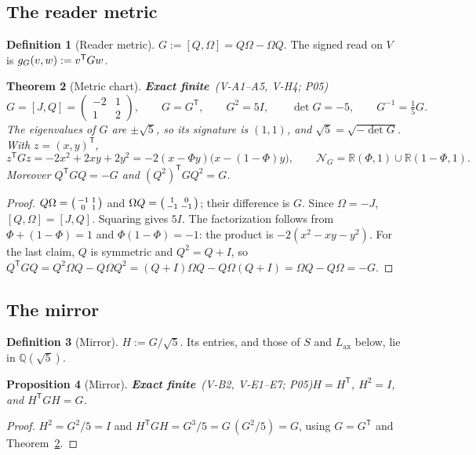 \documentclass[11pt,a4paper]{article}
\newcommand{\RR}{\mathbb{R}}\newcommand{\QQ}{\mathbb{Q}}\newcommand{\ZZ}{\mathbb{Z}}
\newcommand{\tp}{^{\mathsf T}}
\newcommand{\Lax}{L_{\mathrm{ax}}}\newcommand{\Lpr}{L_{\mathrm{pr}}}
\newcommand{\st}[1]{\textsf{\small\textbf{#1}}}
\newcommand{\Sfin}{\st{Exact finite}}\newcommand{\Sder}{\st{Exact derived}}
\theoremstyle{plain}
\newtheorem{thm}{Theorem}[section]
\newtheorem{prop}[thm]{Proposition}
\theoremstyle{definition}
\newtheorem{defn}[thm]{Definition}
\theoremstyle{remark}
\begin{document}
\subsection{The reader metric}
\begin{defn}[Reader metric]
$G:=[Q,\Omega]=Q\Omega-\Omega Q$. The signed read on $V$ is $\gG(v,w):=v\tp Gw$.
\end{defn}
\begin{thm}[Metric chart]\Sfin\ \textit{(V-A1--A5, V-H4; P05)}\label{thm:metric}
\[
G=[J,Q]=\begin{pmatrix}-2&1\\1&2\end{pmatrix},\qquad G=G\tp,\qquad G^2=5I,\qquad \det G=-5,\qquad G^{-1}=\tfrac15G .
\]
The eigenvalues of $G$ are $\pm\sqrt5$, so its signature is $(1,1)$, and $\sqrt5=\sqrt{-\det G}$. With $z=(x,y)\tp$,
\[
z\tp Gz=-2x^2+2xy+2y^2=-2(x-\Phi y)\bigl(x-(1-\Phi)y\bigr),\qquad \mathcal N_G=\RR(\Phi,1)\cup\RR(1-\Phi,1).
\]
Moreover $Q\tp GQ=-G$ and $(Q^2)\tp GQ^2=G$.
\end{thm}
\begin{proof}
$Q\Omega=\begin{psmallmatrix}-1&1\\0&1\end{psmallmatrix}$ and $\Omega Q=\begin{psmallmatrix}1&0\\-1&-1\end{psmallmatrix}$; their difference is $G$. Since $\Omega=-J$, $[Q,\Omega]=[J,Q]$. Squaring gives $5I$. The factorization follows from $\Phi+(1-\Phi)=1$ and $\Phi(1-\Phi)=-1$: the product is $-2(x^2-xy-y^2)$. For the last claim, $Q$ is symmetric and $Q^2=Q+I$, so
$Q\tp GQ=Q^2\Omega Q-Q\Omega Q^2=(Q+I)\Omega Q-Q\Omega(Q+I)=\Omega Q-Q\Omega=-G$.
\end{proof}

\subsection{The mirror}
\begin{defn}[Mirror]
$H:=G/\sqrt5$. Its entries, and those of $S$ and $\Lax$ below, lie in $\QQ(\sqrt5)$.
\end{defn}
\begin{prop}[Mirror]\Sfin\ \textit{(V-B2, V-E1--E7; P05)}\label{prop:mirror}
$H=H\tp$, $H^2=I$, and $H\tp GH=G$.
\end{prop}
\begin{proof}
$H^2=G^2/5=I$ and $H\tp GH=G^3/5=G\,(G^2/5)=G$, using $G=G\tp$ and Theorem~\ref{thm:metric}.
\end{proof}
\end{document}

